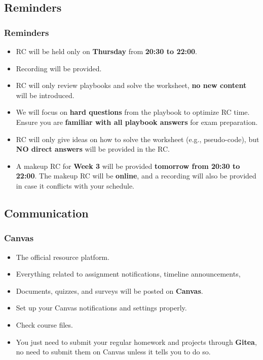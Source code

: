 \documentclass[
	11pt, %
]{beamer}
\begin{document}

\subsection{Reminders}

\begin{frame}
	\frametitle{Reminders}
 
	\begin{itemize}
    \item RC will be held only on \textbf{Thursday} from \textbf{20:30 to 22:00}.
    \item Recording will be provided.
    \item RC will only review playbooks and solve the worksheet, \textbf{no new content} will be introduced.
    \item We will focus on \textbf{hard questions} from the playbook to optimize RC time. Ensure you are \textbf{familiar with all playbook answers} for exam preparation.
    \item RC will only give ideas on how to solve the worksheet (e.g., pseudo-code), but \textbf{NO direct answers} will be provided in the RC.
    \item A makeup RC for \textbf{Week 3} will be provided \textbf{tomorrow from 20:30 to 22:00}. The makeup RC will be \textbf{online}, and a recording will also be provided in case it conflicts with your schedule.
\end{itemize}

\end{frame}



\subsection{Communication}

\begin{frame}
	\frametitle{Canvas}
 
	\begin{itemize}
    \item The official resource platform.
    \item Everything related to assignment notifications, timeline announcements, 
    \item Documents, quizzes, and surveys will be posted on \textbf{Canvas}.
    \item Set up your Canvas notifications and settings properly.
    \item Check course files.
    \item You just need to submit your regular homework and projects through \textbf{Gitea}, no need to submit them on Canvas unless it tells you to do so.
\end{itemize}

\end{frame}
\end{document}
